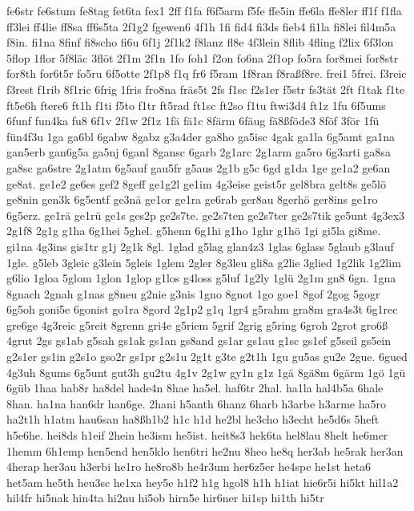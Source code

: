 {fe6str fe6stum fe8tag fet6ta fex1 2ff f1fa f6f5arm f5fe ffe5in ffe6la
ffe8ler ff1f f1fla ff3lei ff4lie ff8sa ff6s5ta 2f1g2 fgewen6 4f1h 1fi
fid4 fi3ds fieb4 fi1la fi8lei fil4m5a f8in.  fi1na 8finf fi8scho fi6u
6f1j 2f1k2 f8lanz fl8e 4f3lein 8flib 4fling f2lix 6f3lon 5flop 1flor
5f8l\"ac 3fl\"ot 2f1m 2f1n 1fo foh1 f2on fo6na 2f1op fo5ra
for8mei for8str for8th for6t5r fo5ru 6f5otte 2f1p8 f1q fr6 f5ram
1f8ran f8ra\ss  f8re.  frei1 5frei.  f3reic f3rest f1rib
8f1ric 6frig 1fris fro8na fr\"as5t 2fs f1sc f2s1er f5str
fs3t\"at 2ft f1tak f1te ft5e6h ftere6 ft1h f1ti f5to f1tr ft5rad
ft1sc ft2so f1tu ftwi3d4 ft1z 1fu 6f5ums 6funf fun4ka fu8\ssend
 6f1v 2f1w 2f1z 1f\"a f\"a1c 8f\"arm 6f\"aug
f\"a8\ss  f\"ode3 8f\"of 3f\"or 1f\"u
f\"un4f3u 1ga ga6bl 6gabw 8gabz g3a4der ga8ho ga5isc 4gak ga1la
6g5amt ga1na gan5erb gan6g5a ga5nj 6ganl 8gansc 6garb 2g1arc 2g1arm
ga5ro 6g3arti ga8sa ga8sc ga6stre 2g1atm 6g5auf gau5fr g5aus 2g1b g5c
6gd g1da 1ge ge1a2 ge6an ge8at.  ge1e2 ge6es gef2 8geff ge1g2l ge1im
4g3eise geist5r gel8bra gelt8s ge5l\"o ge8nin gen3k 6g5entf
ge3n\"a ge1or ge1ra ge6rab ger8au 8gerh\"o ger8ins ge1ro 6g5erz.
ge1r\"a ge1r\"u ge1s ges2p 
ge2s7te. ge2s7ten ge2s7ter ge2s7tik
ge5unt 4g3ex3 2g1f8 2g1g g1ha 6g1hei
5ghel.  g5henn 6g1hi g1ho 1ghr g1h\"o 1gi gi5la gi8me.  gi1na
4g3ins 
gis1tr %
g1j 2g1k 8gl.  1glad g5lag glan4z3 1glas 6glass 5glaub
g3lauf 1gle.  g5leb 3gleic g3lein 5gleis 1glem 2gler 8g3leu gli8a
g2lie 3glied 1g2lik 1g2lim g6lio 1gloa 5glom 1glon 1glop g1los g4loss
g5luf 1g2ly 1gl\"u 2g1m gn8 6gn.  1gna 8gnach 2gnah g1nas g8neu
g2nie g3nis 1gno 8gnot 1go goe1 8gof 2gog 5gogr 6g5oh goni5e 6gonist
go1ra 8gord 2g1p2 g1q 1gr4 g5rahm gra8m gra4s3t 6g1rec gre6ge 4g3reic
g5reit 8grenn gri4e g5riem 5grif 2grig g5ring 6groh 2grot gro6\ss
 4grut 2gs gs1ab g5sah gs1ak gs1an gs8and gs1ar gs1au g1sc
gs1ef g5seil gs5ein g2s1er gs1in g2s1o gso2r gs1pr g2s1u 2g1t g3te
g2t1h 1gu gu5as gu2e 2gue.  6gued 4g3uh 8gums 6g5unt 
gut3h gu2tu
4g1v 2g1w gy1n g1z 1g\"a 8g\"a8m 6g\"arm 1g\"o 1g\"u
6g\"ub 1haa hab8r ha8del hade4n 8hae ha5el.  haf6tr 2hal.  ha1la
hal4b5a 6hale 8han.  ha1na han6dr han6ge.  2hani h5anth 6hanz 6harb
h3arbe h3arme ha5ro ha2t1h h1atm hau6san ha8\ss  h1b2 h1c h1d
he2bl he3cho h3echt he5d6s 5heft h5e6he.  hei8ds h1eif 2hein he3ism
he5ist.  heit8s3 hek6ta hel8lau 8helt he6mer 1hemm 6h1emp hen5end
hen5klo hen6tri he2nu 8heo he8q her3ab he5rak her3an 4herap her3au
h3erbi he1ro he8ro8b he4r3um her6z5er he4spe he1st heta6 het5am he5th
heu3sc he1xa hey5e h1f2 h1g hgol8 h1h h1iat hie6r5i hi5kt hil1a2
hil4fr hi5nak hin4ta hi2nu hi5ob hirn5e hir6ner hi1sp hi1th hi5tr
}

